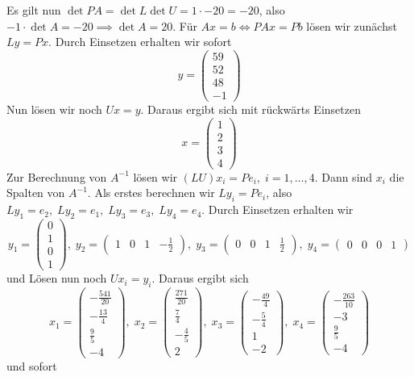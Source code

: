 \documentclass{article}
\theoremstyle{definition}
\newcommand{\equals}{\Longleftrightarrow}
\begin{document}
Es gilt nun $\det PA = \det L \det U = 1 \cdot -20 = -20$, also $-1\cdot \det A = -20 \implies \det A = 20$. Für $Ax = b \equals PAx = Pb$ lösen wir zunächst $Ly = Px$. Durch Einsetzen erhalten wir sofort \[y = \begin{pmatrix}
     59\\52\\48\\-1
\end{pmatrix}\]
Nun lösen wir noch $Ux = y$. Daraus ergibt sich mit rückwärts Einsetzen \[x = \begin{pmatrix}
    1\\2\\3\\4
\end{pmatrix}\]
Zur Berechnung von $A^{-1}$ lösen wir $(LU)x_i = Pe_i,\; i = 1,\dots, 4$. Dann sind $x_i$ die Spalten von $A^{-1}$. Als erstes berechnen wir $Ly_i = Pe_i$, also $Ly_1 = e_2,\; Ly_2 = e_1,\; Ly_3 = e_3,\; Ly_4 = e_4$. Durch Einsetzen erhalten wir
\[
  y_1 = \begin{pmatrix}
      0\\1\\0\\1
  \end{pmatrix},\; y_2 = \begin{pmatrix}
      1 & 0 & 1 & - \frac{1}{2}
  \end{pmatrix},\; y_3 = \begin{pmatrix}
      0 & 0 & 1 & \frac{1}{2}
  \end{pmatrix},\; y_4 = \begin{pmatrix}
      0 & 0 & 0 & 1
  \end{pmatrix}
\] und Lösen nun noch $Ux_i = y_i$. Daraus ergibt sich
\[
    x_1 = \begin{pmatrix}
        -\frac{541}{20}\\[0.2em]-\frac{13}{4}\\[0.2em]\frac{9}{5}\\[0.2em]-4
    \end{pmatrix},\;
    x_2 = \begin{pmatrix}
        \frac{271}{20}\\[0.2em]\frac{7}{4}\\[0.2em]-\frac{4}{5}\\[0.2em]2
    \end{pmatrix},\;
    x_3 = \begin{pmatrix}
        -\frac{49}{4}\\[0.2em]-\frac{5}{4}\\[0.2em]1\\[0.2em]-2
    \end{pmatrix},\;
    x_4 = \begin{pmatrix}
        -\frac{263}{10}\\[0.2em]-3\\[0.2em]\frac{9}{5}\\[0.2em]-4
    \end{pmatrix}
\] und sofort 
\end{document}
